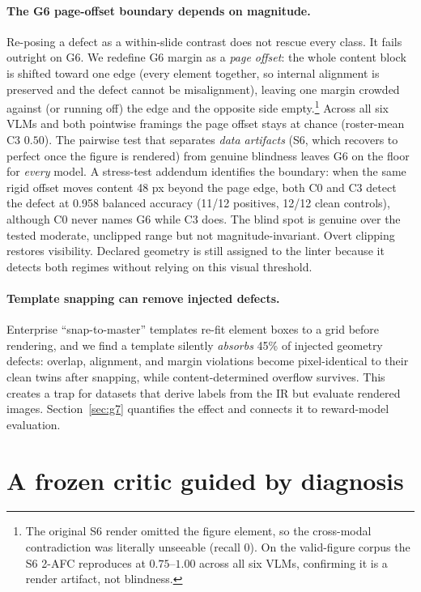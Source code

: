 \documentclass[letterpaper]{article}            %
\newcommand{\g}[1]{\textsf{#1}}        %
\begin{document}
\paragraph{The \g{G6} page-offset boundary depends on magnitude.}
Re-posing a defect as a within-slide contrast does not rescue every class. It fails outright on \g{G6}. We
redefine \g{G6} margin as a \emph{page offset}: the whole content block is shifted toward one edge (every
element together, so internal alignment is preserved and the defect cannot be misalignment), leaving one
margin crowded against (or running off) the edge and the opposite side empty.\footnote{The original \g{S6}
render omitted the figure element, so the cross-modal contradiction was literally unseeable (recall $0$). On
the valid-figure corpus the \g{S6} 2-AFC reproduces at $0.75$--$1.00$ across all six VLMs, confirming it is a
render artifact, not blindness.} Across all six VLMs and both pointwise framings the page offset stays at
chance (roster-mean C3 $0.50$). The pairwise test that separates \emph{data artifacts} (\g{S6}, which
recovers to perfect once the figure is rendered) from genuine blindness leaves \g{G6} on the floor for
\emph{every} model. A stress-test addendum identifies the boundary: when the same rigid offset moves
content 48 px beyond the page edge, both C0 and C3 detect the defect at 0.958 balanced accuracy (11/12 positives,
12/12 clean controls), although C0 never names \g{G6} while C3 does. The blind spot is genuine over the
tested moderate, unclipped range but not magnitude-invariant. Overt clipping restores visibility. Declared
geometry is still assigned to the linter because it detects both regimes without relying on this visual threshold.

\paragraph{Template snapping can remove injected defects.}
Enterprise ``snap-to-master'' templates re-fit element boxes to a grid before rendering, and we find a
template silently \emph{absorbs} 45\% of injected geometry defects: overlap, alignment, and margin violations
become pixel-identical to their clean twins after snapping, while content-determined overflow survives. This
creates a trap for datasets that derive labels from the IR but evaluate rendered images. Section~\ref{sec:g7}
quantifies the effect and connects it to reward-model evaluation.

\section{A frozen critic guided by diagnosis}\label{sec:hybrid}
\end{document}
